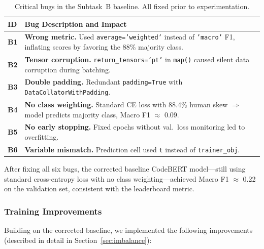 \documentclass[11pt]{article}
\begin{document}
\begin{table}[htbp]
\centering
\footnotesize
\begin{tabularx}{\columnwidth}{@{}l X@{}}
\toprule
\textbf{ID} & \textbf{Bug Description and Impact} \\ \midrule
\textbf{B1} & \textbf{Wrong metric.} Used \texttt{average='weighted'} instead of \texttt{'macro'} F1, inflating scores by favoring the 88\% majority class. \\
\textbf{B2} & \textbf{Tensor corruption.} \texttt{return\_tensors='pt'} in \texttt{map()} caused silent data corruption during batching. \\
\textbf{B3} & \textbf{Double padding.} Redundant \texttt{padding=True} with \texttt{DataCollatorWithPadding}. \\
\textbf{B4} & \textbf{No class weighting.} Standard CE loss with 88.4\% human skew $\Rightarrow$ model predicts majority class, Macro F1 $\approx$ 0.09. \\
\textbf{B5} & \textbf{No early stopping.} Fixed epochs without val.\ loss monitoring led to overfitting. \\
\textbf{B6} & \textbf{Variable mismatch.} Prediction cell used \texttt{t} instead of \texttt{trainer\_obj}. \\
\bottomrule
\end{tabularx}
\caption{Critical bugs in the Subtask~B baseline. All fixed prior to experimentation.}
\label{tab:taskB_bugs}
\end{table}

After fixing all six bugs, the corrected baseline CodeBERT model---still using standard cross-entropy loss with no class weighting---achieved Macro F1 $\approx$ 0.22 on the validation set, consistent with the leaderboard metric. 

\subsubsection{Training Improvements}
\label{sec:taskB_improvements}

Building on the corrected baseline, we implemented the following improvements (described in detail in Section~\ref{sec:imbalance}):
\end{document}
